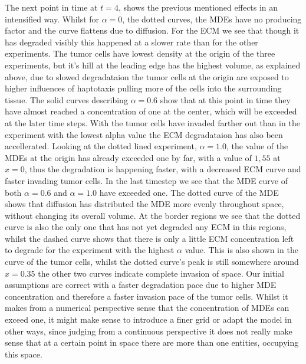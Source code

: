 The next point in time at $t=4$, shows the previous mentioned effects in an intensified way. Whilst for $\alpha=0$, the dotted curves, the MDEs have no producing factor and the curve flattens due to diffusion. For the ECM we see that though it has degraded visibly this happened at a slower rate than for the other experiments. The tumor cells have lowest density at the origin of the three experiments, but it's hill at the leading edge has the highest volume, as explained above, due to slowed degradataion the tumor cells at the origin are exposed to higher influences of haptotaxis pulling more of the cells into the surrounding tissue. 
The solid curves describing $\alpha = 0.6$ show that at this point in time they have almost reached a concentration of one at the center, which will be exceeded at the later time steps. With the tumor cells have invaded farther out than in the experiment with the lowest alpha value the ECM degradataion has also been accellerated.
Looking at the dotted lined experiment, $\alpha=1.0$, the value of the MDEs at the origin has already exceeded one by far, with a value of $1,55$ at $x=0$, thus the degradation is happening faster, with a decreased ECM curve and faster invading tumor cells.\newline 
In the last timestep we see that the MDE curve of both $\alpha=0.6$ and $\alpha=1.0$ have exceeded one. The dotted curve of the MDE shows that diffusion has distributed the MDE more evenly throughout space, without changing its overall volume. At the border regions we see that the dotted curve is also the only one that has not yet degraded any ECM in this regions, whilst the dashed curve shows that there is only a little ECM concentration left to degrade for the experiment with the highest $\alpha$ value. This is also shown in the curve of the tumor cells, whilst the dotted curve's peak is still somewhere around $x=0.35$ the other two curves indicate complete invasion of space. \newline
Our initial assumptions are correct with a faster degradation pace due to higher MDE concentration and therefore a faster invasion pace of the tumor cells. Whilst it makes from a numerical perspective sense that the concentration of MDEs can exceed one, it might make sense to introduce a finer grid or adapt the model in other ways, since judging from a continuous perspective it does not really make sense that at a certain point in space there are more than one entities, occupying this space. 

